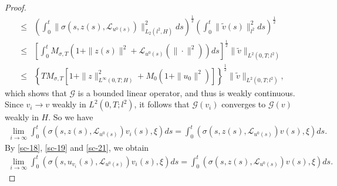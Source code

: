 \documentclass[11pt]{article}
\numberwithin{equation}{section}
\theoremstyle{plain}
\def\leq{\leqslant}
\begin{document}
\begin{proof}
\begin{align}
        \leq &
        \left( \int_0^t \| \sigma(s, z(s), \mathcal{L}_{u^0(s)} ) \|_{L_2(l^2, H)}^2 ds
        \right)^{\frac{1}{2}}
        \left( \int_0^t \| \tilde{v}(s) \|_{l^2}^2 ds
        \right)^{\frac{1}{2}} \nonumber \\
        \leq &
        \left[ \int_0^t M_{\sigma,T}
        \left( 1 + \|z(s)\|^2
        + \mathcal{L}_{u^0(s)}(\|\cdot\|^2)
        \right) ds
        \right]^{\frac{1}{2}}
        \| \tilde{v} \|_{L^2(0,T; l^2)} \nonumber \\
        \leq &
        \left\{ TM_{\sigma,T}
        \left[ 1 + \|z\|_{L^\infty(0,T;H)}^2
        + M_0 \left( 1 + \|u_0\|^2 \right)
        \right]
        \right\}^{\frac{1}{2}}
        \| \tilde{v} \|_{L^2(0,T; l^2)},
    \end{align}
    which shows that
    $\mathcal{G}$ is a bounded linear operator, and thus
    is weakly continuous.
    Since $v_i \rightarrow v$ weakly in $L^2(0, T; l^2)$,
    it follows that
    $\mathcal{G}(v_i)$ converges to
    $\mathcal{G}(v)$
    weakly
    in $H$.
    So we have
    \begin{align} \label{sc-21}
        \lim_{i \to  \infty}
        \int_0^t
        \left( \sigma(s, z(s), \mathcal{L}_{u^0(s)} ) v_i(s), \xi \right) ds
        = \int_0^t
        \left( \sigma(s, z(s), \mathcal{L}_{u^0(s)} ) v(s), \xi \right) ds.
    \end{align}
    By \eqref{sc-18}, \eqref{sc-19} and \eqref{sc-21},
    we obtain
    \begin{align} \label{sc-22}
        \lim_{i \to \infty}
        \int_0^t \left(\sigma(s, u_{v_i}(s), \mathcal{L}_{u^0(s)} ) v_i(s), \xi \right) ds
        = \int_0^t
        \left( \sigma(s, z(s), \mathcal{L}_{u^0(s)} ) v(s), \xi \right) ds.
    \end{align}



\end{proof}
\end{document}
